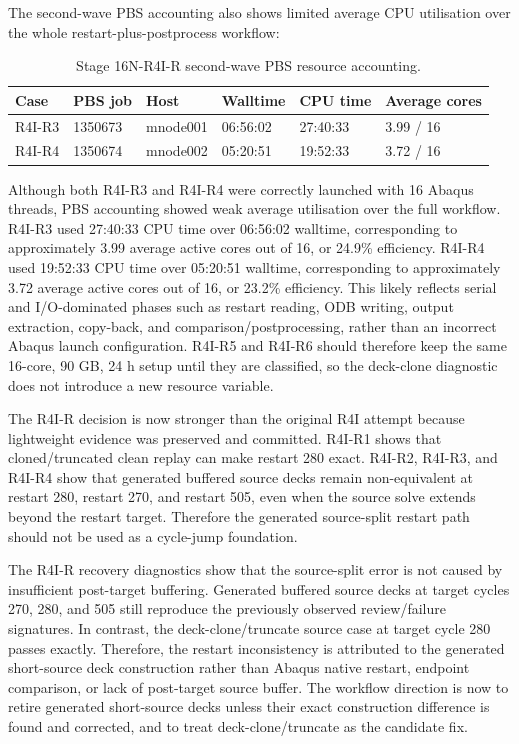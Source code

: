 \documentclass[11pt,a4paper]{article}
\begin{document}
The second-wave PBS accounting also shows limited average CPU utilisation over the whole restart-plus-postprocess workflow:

\begin{table}[H]
\centering
\caption{Stage 16N-R4I-R second-wave PBS resource accounting.}
\begin{tabular}{llllll}
\toprule
Case & PBS job & Host & Walltime & CPU time & Average cores \\
\midrule
R4I-R3 & 1350673 & mnode001 & 06:56:02 & 27:40:33 & 3.99 / 16 \\
R4I-R4 & 1350674 & mnode002 & 05:20:51 & 19:52:33 & 3.72 / 16 \\
\bottomrule
\end{tabular}
\end{table}

Although both R4I-R3 and R4I-R4 were correctly launched with 16 Abaqus threads, PBS accounting showed weak average utilisation over the full workflow. R4I-R3 used 27:40:33 CPU time over 06:56:02 walltime, corresponding to approximately 3.99 average active cores out of 16, or 24.9\% efficiency. R4I-R4 used 19:52:33 CPU time over 05:20:51 walltime, corresponding to approximately 3.72 average active cores out of 16, or 23.2\% efficiency. This likely reflects serial and I/O-dominated phases such as restart reading, ODB writing, output extraction, copy-back, and comparison/postprocessing, rather than an incorrect Abaqus launch configuration. R4I-R5 and R4I-R6 should therefore keep the same 16-core, 90 GB, 24 h setup until they are classified, so the deck-clone diagnostic does not introduce a new resource variable.

The R4I-R decision is now stronger than the original R4I attempt because lightweight evidence was preserved and committed. R4I-R1 shows that cloned/truncated clean replay can make restart 280 exact. R4I-R2, R4I-R3, and R4I-R4 show that generated buffered source decks remain non-equivalent at restart 280, restart 270, and restart 505, even when the source solve extends beyond the restart target. Therefore the generated source-split restart path should not be used as a cycle-jump foundation.

The R4I-R recovery diagnostics show that the source-split error is not caused by insufficient post-target buffering. Generated buffered source decks at target cycles 270, 280, and 505 still reproduce the previously observed review/failure signatures. In contrast, the deck-clone/truncate source case at target cycle 280 passes exactly. Therefore, the restart inconsistency is attributed to the generated short-source deck construction rather than Abaqus native restart, endpoint comparison, or lack of post-target source buffer. The workflow direction is now to retire generated short-source decks unless their exact construction difference is found and corrected, and to treat deck-clone/truncate as the candidate fix.
\end{document}

